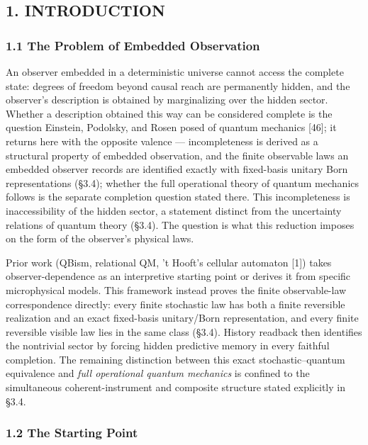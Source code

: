 \documentclass[
]{article}
\begin{document}
\hypertarget{introduction}{%
\subsection{1. INTRODUCTION}\label{introduction}}

\hypertarget{the-problem-of-embedded-observation}{%
\subsubsection{1.1 The Problem of Embedded
Observation}\label{the-problem-of-embedded-observation}}

An observer embedded in a deterministic universe cannot access the
complete state: degrees of freedom beyond causal reach are permanently
hidden, and the observer's description is obtained by marginalizing over
the hidden sector. Whether a description obtained this way can be
considered complete is the question Einstein, Podolsky, and Rosen posed
of quantum mechanics {[}46{]}; it returns here with the opposite valence
--- incompleteness is derived as a structural property of embedded
observation, and the finite observable laws an embedded observer records
are identified exactly with fixed-basis unitary Born representations
(§3.4); whether the full operational theory of quantum mechanics follows
is the separate completion question stated there. This incompleteness is
inaccessibility of the hidden sector, a statement distinct from the
uncertainty relations of quantum theory (§3.4). The question is what
this reduction imposes on the form of the observer's physical laws.

Prior work (QBism, relational QM, 't Hooft's cellular automaton {[}1{]})
takes observer-dependence as an interpretive starting point or derives
it from specific microphysical models. This framework instead proves the
finite observable-law correspondence directly: every finite stochastic
law has both a finite reversible realization and an exact fixed-basis
unitary/Born representation, and every finite reversible visible law
lies in the same class (§3.4). History readback then identifies the
nontrivial sector by forcing hidden predictive memory in every faithful
completion. The remaining distinction between this exact
stochastic--quantum equivalence and \emph{full operational quantum
mechanics} is confined to the simultaneous coherent-instrument and
composite structure stated explicitly in §3.4.

\hypertarget{the-starting-point}{%
\subsubsection{1.2 The Starting Point}\label{the-starting-point}}
\end{document}
